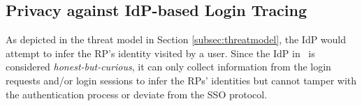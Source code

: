 




\subsection{Privacy against IdP-based Login Tracing}
\label{subsec:IdP-privacy}

As depicted in the threat model in Section \ref{subsec:threatmodel}, the IdP would attempt to infer the RP's identity visited by a user. Since the IdP in \usso\ is considered \emph{honest-but-curious}, it can only collect information from the login requests and/or login sessions to infer the RPs' identities but cannot tamper with the authentication process or deviate from the SSO protocol.

